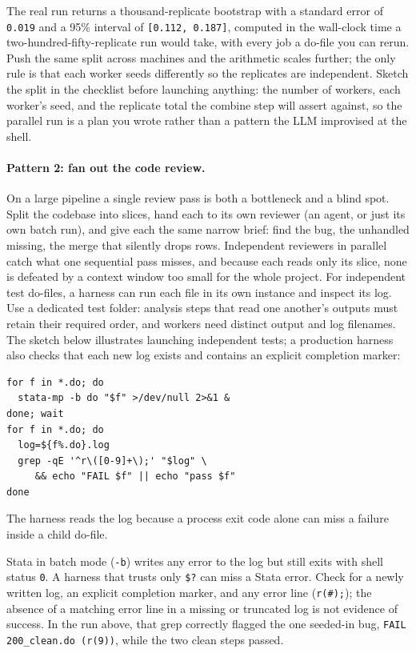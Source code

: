 \documentclass[
    a4paper,
    fontsize=10pt,
    twoside=true,
    numbers=noenddot,
]{kaobook}
\newenvironment{vizcallout}[1][Visualization to build]{%
    \begin{vizbox}[frametitle={#1}]%
}{%
    \end{vizbox}%
}
\begin{document}
The real run returns a thousand-replicate bootstrap with a standard error of \texttt{0.019} and a 95\% interval of \texttt{[0.112, 0.187]}, computed in the wall-clock time a two-hundred-fifty-replicate run would take, with every job a do-file you can rerun. Push the same split across machines and the arithmetic scales further; the only rule is that each worker seeds differently so the replicates are independent. Sketch the split in the checklist before launching anything: the number of workers, each worker's seed, and the replicate total the combine step will assert against, so the parallel run is a plan you wrote rather than a pattern the LLM improvised at the shell.

\paragraph{Pattern 2: fan out the code review.} On a large pipeline a single review pass is both a bottleneck and a blind spot. Split the codebase into slices, hand each to its own reviewer (an agent, or just its own batch run), and give each the same narrow brief: find the bug, the unhandled missing, the merge that silently drops rows. Independent reviewers in parallel catch what one sequential pass misses, and because each reads only its slice, none is defeated by a context window too small for the whole project. For independent test do-files, a harness can run each file in its own instance and inspect its log. Use a dedicated test folder: analysis steps that read one another's outputs must retain their required order, and workers need distinct output and log filenames. The sketch below illustrates launching independent tests; a production harness also checks that each new log exists and contains an explicit completion marker:
\par
{\footnotesize
\begin{verbatim}
for f in *.do; do
  stata-mp -b do "$f" >/dev/null 2>&1 &
done; wait
for f in *.do; do
  log=${f%.do}.log
  grep -qE '^r\([0-9]+\);' "$log" \
     && echo "FAIL $f" || echo "pass $f"
done
\end{verbatim}
}
The harness reads the log because a process exit code alone can miss a failure inside a child do-file.

\begin{vizcallout}[The batch-exit-code trap]
Stata in batch mode (\texttt{-b}) writes any error to the log but still exits with shell status \texttt{0}. A harness that trusts only \texttt{\$?} can miss a Stata error. Check for a newly written log, an explicit completion marker, and any error line (\texttt{r(\#);}); the absence of a matching error line in a missing or truncated log is not evidence of success. In the run above, that grep correctly flagged the one seeded-in bug, \texttt{FAIL 200\_clean.do (r(9))}, while the two clean steps passed.
\end{vizcallout}
\end{document}
